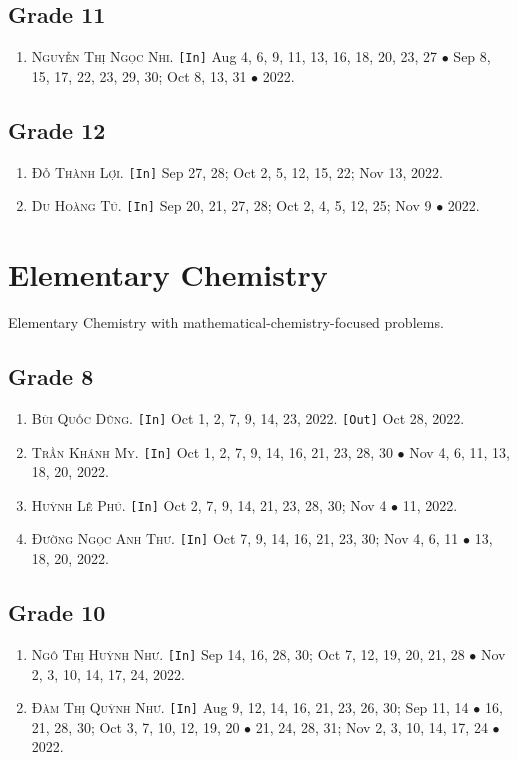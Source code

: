 \documentclass{article}
\numberwithin{equation}{section}
\begin{document}
\subsection{Grade 11}
\begin{enumerate}
	\item \textsc{Nguyễn Thị Ngọc Nhi.} \texttt{[In]} Aug 4, 6, 9, 11, 13, 16, 18, 20, 23, 27 $\bullet$ Sep 8, 15, 17, 22, 23, 29, 30; Oct 8, 13, 31 $\bullet$ 2022.
\end{enumerate}

\subsection{Grade 12}
\begin{enumerate}
	\item \textsc{Đỗ Thành Lợi.} \texttt{[In]} Sep 27, 28; Oct 2, 5, 12, 15, 22; Nov 13, 2022.
	\item \textsc{Du Hoàng Tú.} \texttt{[In]} Sep 20, 21, 27, 28; Oct 2, 4, 5, 12, 25; Nov 9 $\bullet$ 2022.
\end{enumerate}


\section{Elementary Chemistry}
Elementary Chemistry with mathematical-chemistry-focused problems.

\subsection{Grade 8}
\begin{enumerate}
	\item \textsc{Bùi Quốc Dũng.} \texttt{[In]} Oct 1, 2, 7, 9, 14, 23, 2022. \texttt{[Out]} Oct 28, 2022.
	\item \textsc{Trần Khánh My.} \texttt{[In]} Oct 1, 2, 7, 9, 14, 16, 21, 23, 28, 30 $\bullet$ Nov 4, 6, 11, 13, 18, 20, 2022.
	\item \textsc{Huỳnh Lê Phú.} \texttt{[In]} Oct 2, 7, 9, 14, 21, 23, 28, 30; Nov 4 $\bullet$ 11, 2022.
	\item \textsc{Đường Ngọc Anh Thư.} \texttt{[In]} Oct 7, 9, 14, 16, 21, 23, 30; Nov 4, 6, 11 $\bullet$ 13, 18, 20, 2022.
\end{enumerate}

\subsection{Grade 10}
\begin{enumerate}
	\item \textsc{Ngô Thị Huỳnh Như.} \texttt{[In]} Sep 14, 16, 28, 30; Oct 7, 12, 19, 20, 21, 28 $\bullet$ Nov 2, 3, 10, 14, 17, 24, 2022.
	\item \textsc{Đàm Thị Quỳnh Như.} \texttt{[In]} Aug 9, 12, 14, 16, 21, 23, 26, 30; Sep 11, 14 $\bullet$ 16, 21, 28, 30; Oct 3, 7, 10, 12, 19, 20 $\bullet$ 21, 24, 28, 31; Nov 2, 3, 10, 14, 17, 24 $\bullet$ 2022.
\end{enumerate}
\end{document}
